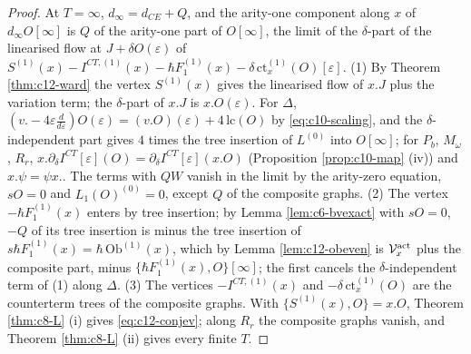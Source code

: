 \begin{proof}
At $T=\infty$, $d_\infty=d_{CE}+Q$, and the arity-one component along $x$ of $d_\infty O[\infty]$ is $Q$ of the arity-one part of $O[\infty]$, the limit of the $\delta$-part of the linearised flow at $J+\delta O(\varepsilon)$ of $S^{(1)}(x)-I^{CT,(1)}(x)-\hbar F_1^{(1)}(x)-\delta\,\mathrm{ct}^{(1)}_x(O)[\varepsilon]$. (1) By Theorem \ref{thm:c12-ward} the vertex $S^{(1)}(x)$ gives the linearised flow of $x.J$ plus the variation term; the $\delta$-part of $x.J$ is $x.O(\varepsilon)$. For $\Delta$, $(v.-4\varepsilon\tfrac d{d\varepsilon})O(\varepsilon)=(v.O)(\varepsilon)+4\,\mathrm{lc}(O)$ by \eqref{eq:c10-scaling}, and the $\delta$-independent part gives $4$ times the tree insertion of $L^{(0)}$ into $O[\infty]$; for $P_b$, $M_\omega$, $R_r$, $x.\partial_\delta I^{CT}[\varepsilon](O)=\partial_\delta I^{CT}[\varepsilon](x.O)$ (Proposition \ref{prop:c10-map} (iv)) and $x.\psi=\psi x.$. The terms with $QW$ vanish in the limit by the arity-zero equation, $sO=0$ and $L_1(O)^{(0)}=0$, except $Q$ of the composite graphs. (2) The vertex $-\hbar F_1^{(1)}(x)$ enters by tree insertion; by Lemma \ref{lem:c6-bvexact} with $sO=0$, $-Q$ of its tree insertion is minus the tree insertion of $s\hbar F_1^{(1)}(x)=\hbar\,\mathrm{Ob}^{(1)}(x)$, which by Lemma \ref{lem:c12-obeven} is $\mathcal V^{\rm act}_x$ plus the composite part, minus $\{\hbar F_1^{(1)}(x),O\}[\infty]$; the first cancels the $\delta$-independent term of (1) along $\Delta$. (3) The vertices $-I^{CT,(1)}(x)$ and $-\delta\,\mathrm{ct}^{(1)}_x(O)$ are the counterterm trees of the composite graphs. With $\{S^{(1)}(x),O\}=x.O$, Theorem \ref{thm:c8-L} (i) gives \eqref{eq:c12-conjev}; along $R_r$ the composite graphs vanish, and Theorem \ref{thm:c8-L} (ii) gives every finite $T$.
\end{proof}


